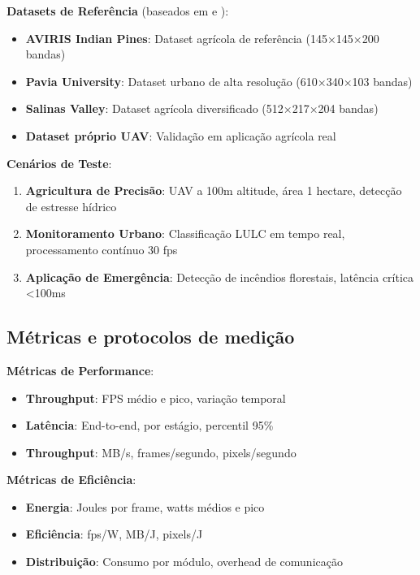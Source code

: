 \textbf{Datasets de Referência} (baseados em \textcite{Lou2024} e \textcite{Ullah2020}):
\begin{itemize}
    \item \textbf{AVIRIS Indian Pines}: Dataset agrícola de referência (145×145×200 bandas)
    \item \textbf{Pavia University}: Dataset urbano de alta resolução (610×340×103 bandas)
    \item \textbf{Salinas Valley}: Dataset agrícola diversificado (512×217×204 bandas)
    \item \textbf{Dataset próprio UAV}: Validação em aplicação agrícola real
\end{itemize}

\textbf{Cenários de Teste}:
\begin{enumerate}
    \item \textbf{Agricultura de Precisão}: UAV a 100m altitude, área 1 hectare, detecção de estresse hídrico
    \item \textbf{Monitoramento Urbano}: Classificação LULC em tempo real, processamento contínuo 30 fps
    \item \textbf{Aplicação de Emergência}: Detecção de incêndios florestais, latência crítica <100ms
\end{enumerate}

\subsection{Métricas e protocolos de medição}\label{subsec:metricas_protocolos}

\textbf{Métricas de Performance}:
\begin{itemize}
    \item \textbf{Throughput}: FPS médio e pico, variação temporal
    \item \textbf{Latência}: End-to-end, por estágio, percentil 95\%
    \item \textbf{Throughput}: MB/s, frames/segundo, pixels/segundo
\end{itemize}

\textbf{Métricas de Eficiência}:
\begin{itemize}
    \item \textbf{Energia}: Joules por frame, watts médios e pico
    \item \textbf{Eficiência}: fps/W, MB/J, pixels/J
    \item \textbf{Distribuição}: Consumo por módulo, overhead de comunicação
\end{itemize}

